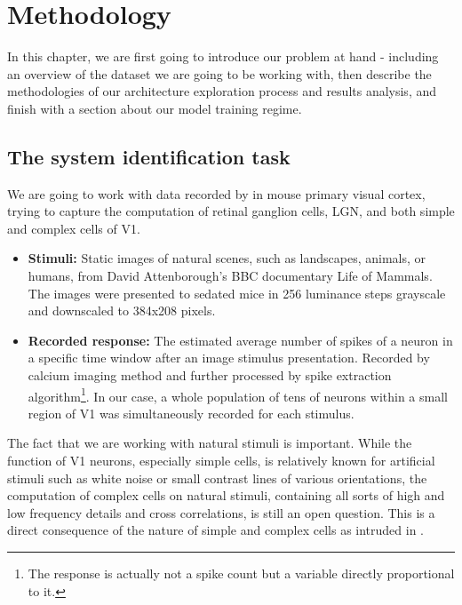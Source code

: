 \chapter{Methodology}\label{ch:4}

In this chapter, we are first going to introduce our problem at hand - including an overview of the dataset we are going to be working with, then describe the methodologies of our architecture exploration process and results analysis, and finish with a section about our model training regime.

\section{The system identification task}

We are going to work with data recorded by \cite{antolik} in mouse primary visual cortex, trying to capture the computation of retinal ganglion cells, LGN, and both simple and complex cells of V1.

\begin{itemize}
	
	\item\textbf{Stimuli:} Static images of natural scenes, such as landscapes, animals, or humans, from David Attenborough’s BBC documentary Life of Mammals. The images were presented to sedated mice in 256 luminance steps grayscale and downscaled to 384x208 pixels.
	
	\item\textbf{Recorded response:} The estimated average number of spikes of a neuron in a specific time window after an image stimulus presentation. Recorded by calcium imaging method and further processed by spike extraction algorithm\footnote{The response is actually not a spike count but a variable directly proportional to it.}. In our case, a whole population of tens of neurons within a small region of V1 was simultaneously recorded for each stimulus.
	
\end{itemize}

The fact that we are working with natural stimuli is important. While the function of V1 neurons, especially simple cells, is relatively known for artificial stimuli such as white noise or small contrast lines of various orientations, the computation of complex cells on natural stimuli, containing all sorts of high and low frequency details and cross correlations, is still an open question. This is a direct consequence of the nature of simple and complex cells as intruded in . 

